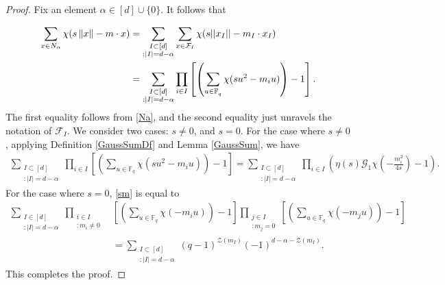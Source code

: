 \documentclass[a4paper,11pt]{amsart}
\numberwithin{equation}{section}
\def\Fq#1{\mathbb{F}_q^{#1}}
\def\norm#1{\left\lVert#1\right\lVert}
\begin{document}
\begin{proof}  Fix an element $\alpha \in [d]\cup \{0\}.$  It follows that

\begin{align}\label{sm}
\sum_{x \in N_\alpha} \chi(s\norm{x} - m\cdot x) 
& =\sum_{\substack{{I \subset [d]}\\{:|I| = d-\alpha}}}\sum_{x \in \mathcal{F}_I}\chi(s||x_I||-m_I \cdot x_I) \notag \\
& =\sum_{\substack{{I \subset [d]}\\{:|I| = d-\alpha}}}\prod_{i \in I}\left[\left(\sum_{u \in \Fq{}}\chi(su^2-m_iu)\right)-1\right].
\end{align}
The first equality follows from \eqref{Na}, and the second equality just unravels the notation of $\mathcal{F}_I$.
We consider two cases: $s \neq 0$, and $s =0$. For the case where $s\neq 0$, applying Definition \ref{GaussSumDf} and Lemma \ref{GaussSum}, we have
\begin{align*}
\sum_{\substack{{I \subset [d]}\\{:|I| = d-\alpha}}}\prod_{i \in I}\left[\left(\sum_{u \in \Fq{}}\chi(su^2-m_iu)\right)-1\right] 
= \sum_{\substack{{I \subset [d]}\\{:|I| = d-\alpha}}}\prod_{i \in I}\left(\eta(s)\mathcal{G}_1\chi\left(-\frac{m_i^2}{4s}\right)-1\right).
\end{align*}
For the case where $s=0$, \eqref{sm} is equal to
\begin{align*}
\sum_{\substack{{I \in [d]}\\:{|I| = d - \alpha }}}\prod_{\substack{{i \in I}\\{:m_i \neq 0}}} & \left[\left(\sum_{u \in \Fq{}} \chi(-m_iu)\right)-1\right] \prod_{\substack{{j \in I}\\{:m_j =0}}}\left[\left(\sum_{u \in \Fq{}}\chi(-m_ju)\right)-1\right]\\
& = \sum_{\substack{{I \subset [d]}\\{:|I| = d-\alpha}}}(q-1)^{\mathcal{Z}(m_{I})}(-1)^{d-\alpha-\mathcal{Z}(m_I)}.
\end{align*}
This completes the proof.
\end{proof}
\end{document}
